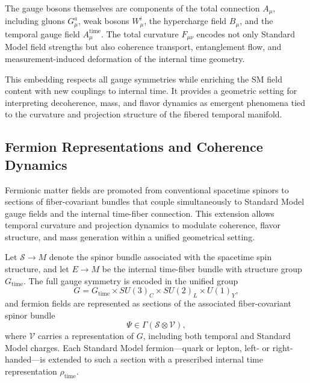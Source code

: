 \documentclass[11pt]{article}
\begin{document}
The gauge bosons themselves are components of the total connection \( A_\mu \), including gluons \( G^a_\mu \), weak bosons \( W^i_\mu \), the hypercharge field \( B_\mu \), and the temporal gauge field \( A^{\mathrm{time}}_\mu \). The total curvature \( F_{\mu\nu} \) encodes not only Standard Model field strengths but also coherence transport, entanglement flow, and measurement-induced deformation of the internal time geometry.

This embedding respects all gauge symmetries while enriching the SM field content with new couplings to internal time. It provides a geometric setting for interpreting decoherence, mass, and flavor dynamics as emergent phenomena tied to the curvature and projection structure of the fibered temporal manifold.
\subsection{Fermion Representations and Coherence Dynamics}
Fermionic matter fields are promoted from conventional spacetime spinors to sections of fiber-covariant bundles that couple simultaneously to Standard Model gauge fields and the internal time-fiber connection. This extension allows temporal curvature and projection dynamics to modulate coherence, flavor structure, and mass generation within a unified geometrical setting.

Let \( \mathcal{S} \to M \) denote the spinor bundle associated with the spacetime spin structure, and let \( E \to M \) be the internal time-fiber bundle with structure group \( G_{\mathrm{time}} \). The full gauge symmetry is encoded in the unified group
\begin{equation}
G = G_{\mathrm{time}} \times SU(3)_C \times SU(2)_L \times U(1)_Y,
\end{equation}
and fermion fields are represented as sections of the associated fiber-covariant spinor bundle
\begin{equation}
\Psi \in \Gamma(\mathcal{S} \otimes \mathcal{V}),
\end{equation}
where \( \mathcal{V} \) carries a representation of \( G \), including both temporal and Standard Model charges. Each Standard Model fermion—quark or lepton, left- or right-handed—is extended to such a section with a prescribed internal time representation \( \rho_{\mathrm{time}} \).
\end{document}
